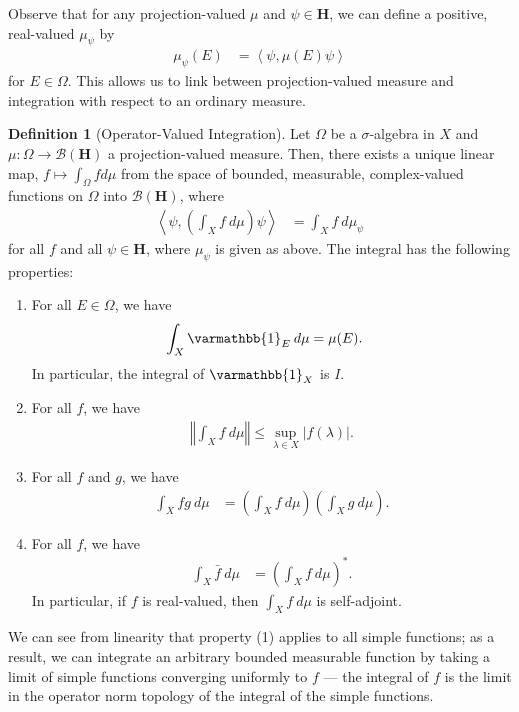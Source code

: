 \documentclass[12pt]{extarticle}
\newcommand{\iprod}[2]{\left\langle #1,#2\right\rangle}
\newcommand{\norm}[1]{\left\Vert #1\right\Vert}
\theoremstyle{plain}
\theoremstyle{definition}
\newtheorem*{definition}{Definition}
\theoremstyle{remark}
\renewcommand{\newline}{\hfill\break}
\begin{document}
  Observe that for any projection-valued $\mu$ and $\psi\in \mathbf{H}$, we can define a positive, real-valued $\mu_{\psi}$ by
  \begin{align*}
    \mu_{\psi}(E) &= \iprod{\psi}{\mu(E)\psi}
  \end{align*}
  for $E\in \Omega$. This allows us to link between projection-valued measure and integration with respect to an ordinary measure.
  \begin{definition}[Operator-Valued Integration]
    Let $\Omega$ be a $\sigma$-algebra in $X$ and $\mu: \Omega \rightarrow \mathcal{B}\left(\mathbf{H}\right)$ a projection-valued measure. Then, there exists a unique linear map, $f \mapsto \int_{\Omega}fd\mu$ from the space of bounded, measurable, complex-valued functions on $\Omega$ into $\mathcal{B}(\mathbf{H})$, where
    \begin{align*}
      \iprod{\psi}{\left(\int_{X}f\:d\mu\right)\psi} &= \int_{X}f \:d\mu_{\psi}
    \end{align*}
    for all $f$ and all $\psi \in \mathbf{H}$, where $\mu_{\psi}$ is given as above. The integral has the following properties:
    \begin{enumerate}[(1)]
      \item For all $E\in \Omega$, we have
        \begin{align*}
          \int_{X}^{} \varmathbb{1}_{E} \:d\mu &= \mu(E).
        \end{align*}
        In particular, the integral of $\varmathbb{1}_{X}$ is $I$.
      \item For all $f$, we have
        \begin{align*}
          \norm{\int_{X}f\:d\mu} \leq \sup_{\lambda \in X}|f(\lambda)|.
        \end{align*}
      \item For all $f$ and $g$, we have
        \begin{align*}
          \int_{X}fg\:d\mu &= \left(\int_{X}f\:d\mu\right) \left(\int_{X}^{} g \:d\mu\right).
        \end{align*}
      \item For all $f$, we have
        \begin{align*}
          \int_{X}^{} \bar{f} \:d\mu &= \left(\int_{X}^{} f \:d\mu\right)^{\ast}.
        \end{align*}
        In particular, if $f$ is real-valued, then $\int_{X}f\:d\mu$ is self-adjoint.
    \end{enumerate}
  \end{definition}
  We can see from linearity that property (1) applies to all simple functions; as a result, we can integrate an arbitrary bounded measurable function by taking a limit of simple functions converging uniformly to $f$ --- the integral of $f$ is the limit in the operator norm topology of the integral of the simple functions.\newline
\end{document}
